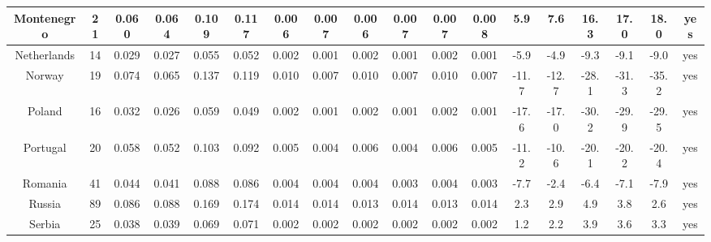 \documentclass[10pt]{article}
\begin{document}
\begin{center}
\begin{tabular}{|c|c|c|c|c|c|c|c|c|c|c|c|c|c|c|c|c|c|}
\hline
Montenegro & 21 & 0.060 & 0.064 & 0.109 & 0.117 & 0.006 & 0.007 & 0.006 & 0.007 & 0.007 & 0.008 & 5.9 & 7.6 & 16.3 & 17.0 & 18.0 & yes \\
\hline
Netherlands & 14 & 0.029 & 0.027 & 0.055 & 0.052 & 0.002 & 0.001 & 0.002 & 0.001 & 0.002 & 0.001 & -5.9 & -4.9 & -9.3 & -9.1 & -9.0 & yes \\
\hline
Norway & 19 & 0.074 & 0.065 & 0.137 & 0.119 & 0.010 & 0.007 & 0.010 & 0.007 & 0.010 & 0.007 & -11.7 & -12.7 & -28.1 & -31.3 & -35.2 & yes \\
\hline
Poland & 16 & 0.032 & 0.026 & 0.059 & 0.049 & 0.002 & 0.001 & 0.002 & 0.001 & 0.002 & 0.001 & -17.6 & -17.0 & -30.2 & -29.9 & -29.5 & yes \\
\hline
Portugal & 20 & 0.058 & 0.052 & 0.103 & 0.092 & 0.005 & 0.004 & 0.006 & 0.004 & 0.006 & 0.005 & -11.2 & -10.6 & -20.1 & -20.2 & -20.4 & yes \\
\hline
Romania & 41 & 0.044 & 0.041 & 0.088 & 0.086 & 0.004 & 0.004 & 0.004 & 0.003 & 0.004 & 0.003 & -7.7 & -2.4 & -6.4 & -7.1 & -7.9 & yes \\
\hline
Russia & 89 & 0.086 & 0.088 & 0.169 & 0.174 & 0.014 & 0.014 & 0.013 & 0.014 & 0.013 & 0.014 & 2.3 & 2.9 & 4.9 & 3.8 & 2.6 & yes \\
\hline
Serbia & 25 & 0.038 & 0.039 & 0.069 & 0.071 & 0.002 & 0.002 & 0.002 & 0.002 & 0.002 & 0.002 & 1.2 & 2.2 & 3.9 & 3.6 & 3.3 & yes \\
\hline
\end{tabular}
\end{center}
\end{document}
